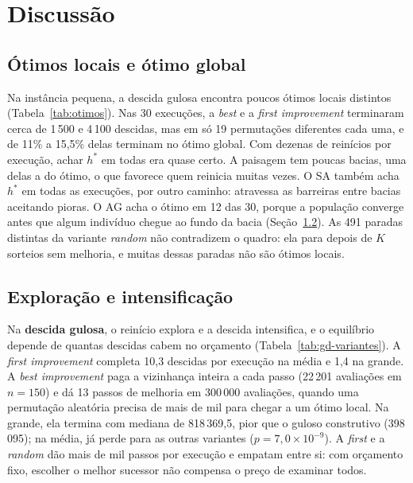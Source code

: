 \section{Discussão}
\label{sec:discussao}

\subsection{Ótimos locais e ótimo global}

Na instância pequena, a descida gulosa encontra poucos ótimos locais distintos (Tabela~\ref{tab:otimos}).
Nas 30 execuções, a \textit{best} e a \textit{first improvement} terminaram cerca de 1\,500 e 4\,100 descidas, mas em só 19 permutações diferentes cada uma, e de 11\% a 15,5\% delas terminam no ótimo global.
Com dezenas de reinícios por execução, achar $h^*$ em todas era quase certo.
A paisagem tem poucas bacias, uma delas a do ótimo, o que favorece quem reinicia muitas vezes.
O SA também acha $h^*$ em todas as execuções, por outro caminho: atravessa as barreiras entre bacias aceitando pioras.
O AG acha o ótimo em 12 das 30, porque a população converge antes que algum indivíduo chegue ao fundo da bacia (Seção~\ref{sec:exploracao}).
As 491 paradas distintas da variante \textit{random} não contradizem o quadro: ela para depois de $K$ sorteios sem melhoria, e muitas dessas paradas não são ótimos locais.

\begin{table}[tbp]
  \centering
  \caption{Instância pequena: ótimos locais da descida gulosa (médias por execução, total distinto nas 30 execuções, fração das descidas que terminam em $h^*$) e execuções que atingiram $h^* = 1\,875$.}
  \label{tab:otimos}
\end{table}

\subsection{Exploração e intensificação}
\label{sec:exploracao}

Na \textbf{descida gulosa}, o reinício explora e a descida intensifica, e o equilíbrio depende de quantas descidas cabem no orçamento (Tabela~\ref{tab:gd-variantes}).
A \textit{first improvement} completa 10,3 descidas por execução na média e 1,4 na grande.
A \textit{best improvement} paga a vizinhança inteira a cada passo (22\,201 avaliações em $n = 150$) e dá 13 passos de melhoria em 300\,000 avaliações, quando uma permutação aleatória precisa de mais de mil para chegar a um ótimo local.
Na grande, ela termina com mediana de 818\,369,5, pior que o guloso construtivo (398\,095); na média, já perde para as outras variantes ($p = 7{,}0\times10^{-9}$).
A \textit{first} e a \textit{random} dão mais de mil passos por execução e empatam entre si: com orçamento fixo, escolher o melhor sucessor não compensa o preço de examinar todos.

